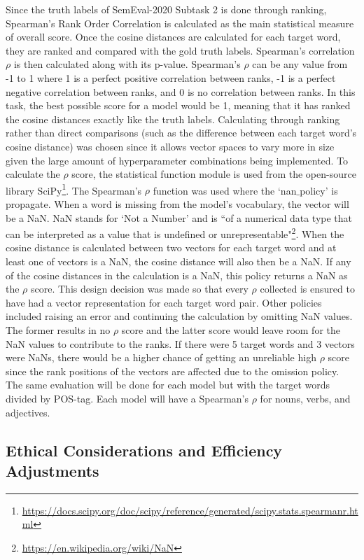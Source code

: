 Since the truth labels of SemEval-2020 Subtask 2 is done through ranking, Spearman's Rank Order Correlation is calculated as the main statistical measure of overall score. Once the cosine distances are calculated for each target word, they are ranked and compared with the gold truth labels. Spearman's correlation $\rho$ is then calculated along with its p-value. Spearman’s $\rho$ can be any value from -1 to 1 where 1 is a perfect positive correlation between ranks, -1 is a perfect negative correlation between ranks, and 0 is no correlation between ranks. In this task, the best possible score for a model would be 1, meaning that it has ranked the cosine distances exactly like the truth labels. Calculating through ranking rather than direct comparisons (such as the difference between each target word’s cosine distance) was chosen since it allows vector spaces to vary more in size given the large amount of hyperparameter combinations being implemented.  To calculate the $\rho$ score, the statistical function module is used from the open-source library SciPy\footnote{\url{https://docs.scipy.org/doc/scipy/reference/generated/scipy.stats.spearmanr.html}}. The Spearman's $\rho$ function was used where the `nan$\_$policy' is propagate. When a word is missing from the model's vocabulary, the vector will be a NaN. NaN stands for `Not a Number' and is ``of a numerical data type that can be interpreted as a value that is undefined or unrepresentable"\footnote{\url{https://en.wikipedia.org/wiki/NaN}}. When the cosine distance is calculated between two vectors for each target word and at least one of vectors is a NaN, the cosine distance will also then be a NaN. If any of the cosine distances in the calculation is a NaN, this policy returns a NaN as the $\rho$ score. This design decision was made so that every $\rho$ collected is ensured to have had a vector representation for each target word pair. Other policies included raising an error and continuing the calculation by omitting NaN values. The former results in no $\rho$ score and the latter score would leave room for the NaN values to contribute to the ranks. If there were 5 target words and 3 vectors were NaNs, there would be a higher chance of getting an unreliable high $\rho$ score since the rank positions of the vectors are affected due to the omission policy. The same evaluation will be done for each model but with the target words divided by POS-tag. Each model will have a Spearman’s $\rho$ for nouns, verbs, and adjectives. 


\subsection{Ethical Considerations and Efficiency Adjustments}
\label{exp-ethics}

